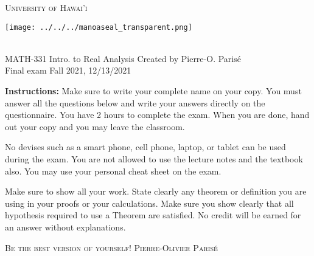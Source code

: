 \documentclass[addpoints, 12pt]{exam}%
\theoremstyle{definition}
\begin{document}
\begin{center}
\begin{minipage}{0.3\textwidth}
\begin{Huge}
\textsc{University of Hawai'i}
\end{Huge}
\end{minipage}
\hfill
\begin{minipage}{0.12\textwidth}
\texttt{[image: ../../../manoaseal\_transparent.png]}
\end{minipage}
\end{center}

	\noindent \hrulefill \\
	MATH-331 Intro. to Real Analysis \hfill Created by Pierre-O. Paris{\'e}\\
	Final exam \hfill Fall 2021, 12/13/2021\\\vspace*{-0.7cm}
	
	\noindent\hrulefill
	
\vspace*{1cm}

\noindent{}

\vspace*{1cm}
\begin{center}
\gradetable[h][questions]
\end{center}
\vspace*{1cm}

{\bf Instructions:} Make sure to write your complete name on your copy. You must answer all the questions below and write your answers directly on the questionnaire. You have 2 hours to complete the exam. When you are done, hand out your copy and you may leave the classroom.

No devises such as a smart phone, cell phone, laptop, or tablet can be used during the exam. You are not allowed to use the lecture notes and the textbook also. You may use your personal cheat sheet on the exam.

Make sure to show all your work. State clearly any theorem or definition you are using in your proofs or your calculations. Make sure you show clearly that all hypothesis required to use a Theorem are satisfied. No credit will be earned for an answer without explanations.

\vspace*{2cm}
\noindent \textsc{Be the best version of yourself!} \hfill \textsc{Pierre-Olivier Parisé}
\end{document}
